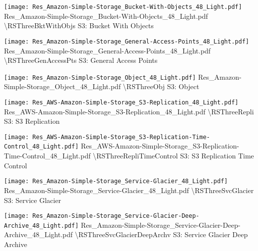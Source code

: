  {\texttt{[image: Res\_Amazon-Simple-Storage\_Bucket-With-Objects\_48\_Light.pdf]}} {Res\_Amazon-Simple-Storage\_Bucket-With-Objects\_48\_Light.pdf} {{\textbackslash}RSThreeBktWithObjs} {S3: Bucket With Objects}

 {\texttt{[image: Res\_Amazon-Simple-Storage\_General-Access-Points\_48\_Light.pdf]}} {Res\_Amazon-Simple-Storage\_General-Access-Points\_48\_Light.pdf} {{\textbackslash}RSThreeGenAccessPts} {S3: General Access Points}

 {\texttt{[image: Res\_Amazon-Simple-Storage\_Object\_48\_Light.pdf]}} {Res\_Amazon-Simple-Storage\_Object\_48\_Light.pdf} {{\textbackslash}RSThreeObj} {S3: Object}

 {\texttt{[image: Res\_AWS-Amazon-Simple-Storage\_S3-Replication\_48\_Light.pdf]}} {Res\_AWS-Amazon-Simple-Storage\_S3-Replication\_48\_Light.pdf} {{\textbackslash}RSThreeRepli} {S3: S3 Replication}

 {\texttt{[image: Res\_AWS-Amazon-Simple-Storage\_S3-Replication-Time-Control\_48\_Light.pdf]}} {Res\_AWS-Amazon-Simple-Storage\_S3-Replication-Time-Control\_48\_Light.pdf} {{\textbackslash}RSThreeRepliTimeControl} {S3: S3 Replication Time Control}

 {\texttt{[image: Res\_Amazon-Simple-Storage\_Service-Glacier\_48\_Light.pdf]}} {Res\_Amazon-Simple-Storage\_Service-Glacier\_48\_Light.pdf} {{\textbackslash}RSThreeSvcGlacier} {S3: Service Glacier}

 {\texttt{[image: Res\_Amazon-Simple-Storage\_Service-Glacier-Deep-Archive\_48\_Light.pdf]}} {Res\_Amazon-Simple-Storage\_Service-Glacier-Deep-Archive\_48\_Light.pdf} {{\textbackslash}RSThreeSvcGlacierDeepArchv} {S3: Service Glacier Deep Archive}

